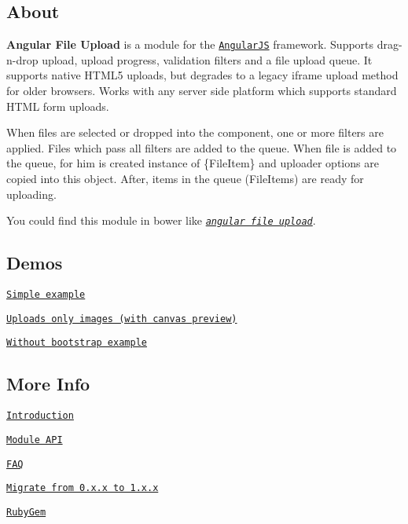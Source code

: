 



\subsection*{About}

{\bfseries Angular File Upload} is a module for the \href{http://angularjs.org/}{\tt Angular\+JS} framework. Supports drag-\/n-\/drop upload, upload progress, validation filters and a file upload queue. It supports native H\+T\+M\+L5 uploads, but degrades to a legacy iframe upload method for older browsers. Works with any server side platform which supports standard H\+T\+ML form uploads.

When files are selected or dropped into the component, one or more filters are applied. Files which pass all filters are added to the queue. When file is added to the queue, for him is created instance of {\ttfamily \{File\+Item\}} and uploader options are copied into this object. After, items in the queue (File\+Items) are ready for uploading.

You could find this module in bower like \href{http://bower.io/search/?q=angular%20file%20upload}{\tt {\itshape angular file upload}}.

\subsection*{Demos}


\begin{DoxyEnumerate}
\item \href{http://nervgh.github.io/pages/angular-file-upload/examples/simple}{\tt Simple example}
\item \href{http://nervgh.github.io/pages/angular-file-upload/examples/image-preview}{\tt Uploads only images (with canvas preview)}
\item \href{http://nervgh.github.io/pages/angular-file-upload/examples/without-bootstrap}{\tt Without bootstrap example}
\end{DoxyEnumerate}

\subsection*{More Info}


\begin{DoxyEnumerate}
\item \href{https://github.com/nervgh/angular-file-upload/wiki/Introduction}{\tt Introduction}
\item \href{https://github.com/nervgh/angular-file-upload/wiki/Module-API}{\tt Module A\+PI}
\item \href{https://github.com/nervgh/angular-file-upload/wiki/FAQ}{\tt F\+AQ}
\item \href{https://github.com/nervgh/angular-file-upload/wiki/Migrate-from-0.x.x-to-1.x.x}{\tt Migrate from 0.\+x.\+x to 1.\+x.\+x}
\item \href{https://github.com/marthyn/angularjs-file-upload-rails}{\tt Ruby\+Gem} 
\end{DoxyEnumerate}